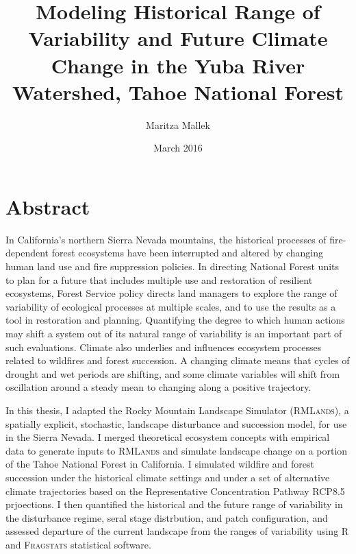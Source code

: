 \documentclass[12pt]{book}
\begin{document}
\author{Maritza Mallek}
\title{Modeling Historical Range of Variability and Future Climate Change in the Yuba River Watershed, Tahoe National Forest}
\date{March 2016}

\maketitle

\section*{Abstract}
In California's northern Sierra Nevada mountains, the historical processes of fire-dependent forest ecosystems have been interrupted and altered by changing human land use and fire suppression policies. In directing National Forest units to plan for a future that includes multiple use and restoration of resilient ecosystems, Forest Service policy directs land managers to explore the range of variability of ecological processes at multiple scales, and to use the results as a tool in restoration and planning. Quantifying the degree to which human actions may shift a system out of its natural range of variability is an important part of such evaluations. Climate also underlies and influences ecosystem processes related to wildfires and forest succession. A changing climate means that cycles of drought and wet periods are shifting, and some climate variables will shift from oscillation around a steady mean to changing along a positive trajectory.

In this thesis, I adapted the Rocky Mountain Landscape Simulator (\textsc{RMLands}), a spatially explicit, stochastic, landscape disturbance and succession model, for use in the Sierra Nevada. I merged theoretical ecosystem concepts with empirical data to generate inputs to \textsc{RMLands} and simulate landscape change on a portion of the Tahoe National Forest in California. I simulated wildfire and forest succession under the historical climate settings and under a set of alternative climate trajectories based on the Representative Concentration Pathway RCP8.5 prjoections. I then quantified the historical and the future range of variability in the disturbance regime, seral stage distrbution, and patch configuration, and assessed departure of the current landscape from the ranges of variability using R and \textsc{Fragstats} statistical software.
\end{document}
